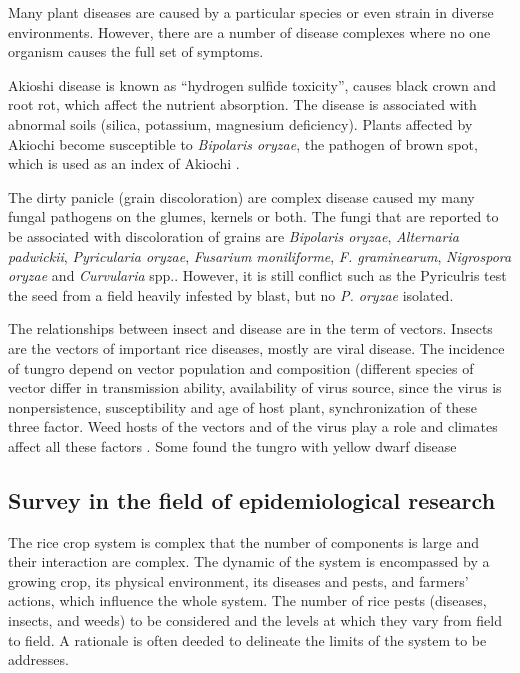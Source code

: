 Many plant diseases are caused by a particular species or even strain in diverse environments. However, there are a number of disease complexes where no one organism causes the full set of symptoms.

Akioshi disease is known as ``hydrogen sulfide toxicity'', causes black crown and root rot, which affect the nutrient absorption. The disease is associated with abnormal soils (silica, potassium, magnesium deficiency). Plants affected by Akiochi become susceptible to \textit{Bipolaris oryzae}, the pathogen of brown spot, which is used as an index of Akiochi \citep{Ou_1985_Rice}.

The dirty panicle (grain discoloration) are complex disease caused my many fungal pathogens on the glumes, kernels or both. The fungi that are reported to be associated with discoloration of grains are \textit{Bipolaris oryzae}, \textit{Alternaria padwickii}, \textit{Pyricularia oryzae}, \textit{Fusarium moniliforme}, \textit{F. graminearum}, \textit{Nigrospora oryzae} and \textit{Curvularia} spp.\cite{Ou_1985_Rice}. However, it is still conflict such as the Pyriculris test the seed from a field heavily infested by blast, but no \textit{P. oryzae} isolated.

The relationships between insect and disease are in the term of vectors. Insects are the vectors of important rice diseases, mostly are viral disease. The incidence of tungro depend on vector population and composition (different species of vector differ in transmission ability, availability of virus source, since the virus is nonpersistence, susceptibility and age of host plant, synchronization of these three factor. Weed hosts of the vectors and of the virus play a role and climates affect all these factors \cite{Naganagoud_2010_Studies}. Some found the tungro with yellow dwarf disease \cite{Ou_1985_Rice}

\subsection*{Survey in the field of epidemiological research}

The rice crop system is complex that the number of components is large and their interaction are complex. The dynamic of the system is encompassed by a growing crop, its physical environment, its diseases and pests, and farmers' actions, which influence the whole system. The number of rice pests (diseases, insects, and weeds) to be considered and the levels at which they vary from field to field. A rationale is often deeded to delineate the limits of the system to be addresses.

